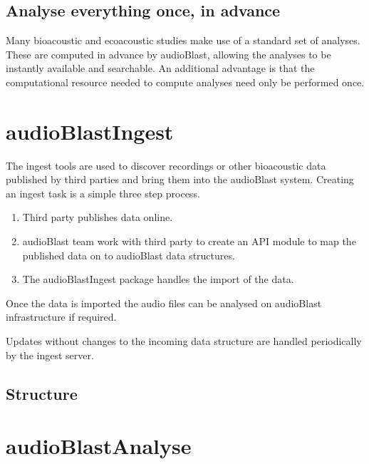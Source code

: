 \documentclass[
]{book}
\begin{document}
\hypertarget{analyse-everything-once-in-advance}{%
\section{Analyse everything once, in advance}\label{analyse-everything-once-in-advance}}

Many bioacoustic and ecoacoustic studies make use of a standard set of analyses. These are computed in advance by audioBlast, allowing the analyses to be instantly available and searchable. An additional advantage is that the computational resource needed to compute analyses need only be performed once.

\hypertarget{audioblastingest}{%
\chapter{audioBlastIngest}\label{audioblastingest}}

The ingest tools are used to discover recordings or other bioacoustic data published by third parties and bring them into the audioBlast system. Creating an ingest task is a simple three step process.

\begin{enumerate}
\def\labelenumi{\arabic{enumi}.}
\item
  Third party publishes data online.
\item
  audioBlast team work with third party to create an API module to map the published data on to audioBlast data structures.
\item
  The audioBlastIngest package handles the import of the data.
\end{enumerate}

Once the data is imported the audio files can be analysed on audioBlast infrastructure if required.

Updates without changes to the incoming data structure are handled periodically by the ingest server.

\hypertarget{structure}{%
\section{Structure}\label{structure}}

\hypertarget{audioblastanalyse}{%
\chapter{audioBlastAnalyse}\label{audioblastanalyse}}
\end{document}
